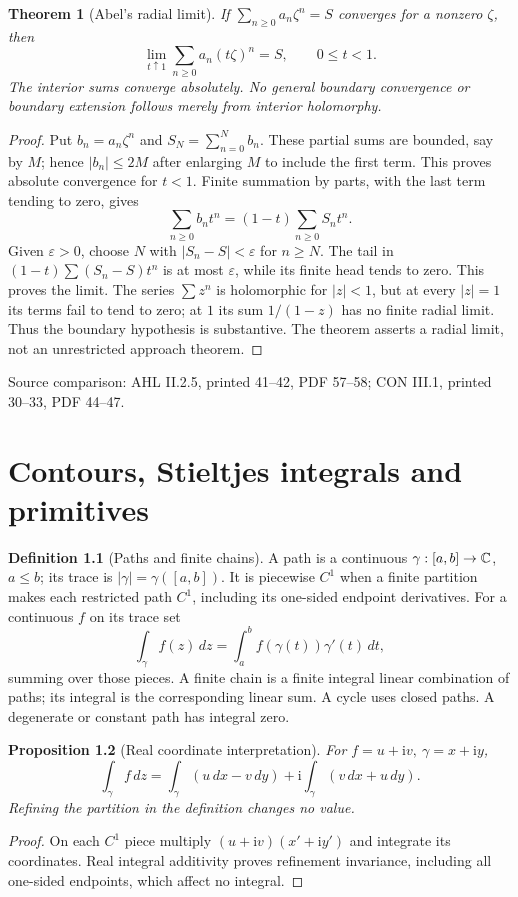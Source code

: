 \documentclass[11pt,a4paper,openany]{book}
\newtheorem{theorem}{Theorem}[chapter]
\newtheorem{proposition}[theorem]{Proposition}
\theoremstyle{definition}
\newtheorem{definition}[theorem]{Definition}
\theoremstyle{remark}\newtheorem{remark}[theorem]{Remark}
\newcommand{\eps}{\varepsilon}\newcommand{\ee}{\varepsilon}
\newcommand{\dd}{\,d}\newcommand{\iu}{\mathrm i}
\newcommand{\family}[1]{}
\newcommand{\source}[1]{\par\begingroup\small\sffamily\color{black!65}Source comparison: #1\par\endgroup}
\begin{document}
\begin{theorem}[Abel's radial limit]\family{D12.02.06}\label{d12:02-06}
If \(\sum_{n\ge0}a_n\zeta^n=S\) converges for a nonzero \(\zeta\), then
\[
 \lim_{t\uparrow1}\sum_{n\ge0}a_n(t\zeta)^n=S,\qquad 0\le t<1.
\]
The interior sums converge absolutely. No general boundary convergence
or boundary extension follows merely from interior holomorphy.
\end{theorem}
\begin{proof}
Put \(b_n=a_n\zeta^n\) and \(S_N=\sum_{n=0}^Nb_n\).
These partial sums are bounded, say by \(M\); hence \(|b_n|\le2M\)
after enlarging \(M\) to include the first term. This proves absolute
convergence for \(t<1\). Finite summation by parts, with the last term
tending to zero, gives
\[
 \sum_{n\ge0}b_nt^n=(1-t)\sum_{n\ge0}S_nt^n.
\]
Given \(\eps>0\), choose \(N\) with \(|S_n-S|<\eps\) for \(n\ge N\).
The tail in \((1-t)\sum(S_n-S)t^n\) is at most \(\eps\), while its
finite head tends to zero. This proves the limit.
The series \(\sum z^n\) is holomorphic for \(|z|<1\), but at every
\(|z|=1\) its terms fail to tend to zero; at \(1\) its sum
\(1/(1-z)\) has no finite radial limit. Thus the boundary hypothesis is
substantive. The theorem asserts a radial limit, not an unrestricted
approach theorem.
\end{proof}
\source{AHL II.2.5, printed 41--42, PDF 57--58; CON III.1, printed 30--33, PDF 44--47.}



\chapter{Contours, Stieltjes integrals and primitives}\label{ch:d12-03}

\begin{definition}[Paths and finite chains]\family{D12.03.01}\label{d12:03-01}
A path is a continuous \(\gamma:[a,b]\to\mathbb C\), \(a\le b\); its trace is
\(|\gamma|=\gamma([a,b])\). It is piecewise \(C^1\) when a finite
partition makes each restricted path \(C^1\), including its one-sided
endpoint derivatives. For a continuous \(f\) on its trace set
\[
 \int_\gamma f(z)\dd z=\int_a^b f(\gamma(t))\gamma'(t)\dd t,
\]
summing over those pieces. A finite chain is a finite integral linear
combination of paths; its integral is the corresponding linear sum.
A cycle uses closed paths. A degenerate or constant path has integral zero.
\end{definition}
\begin{proposition}[Real coordinate interpretation]\label{d12:03-01-coordinates}
For \(f=u+\iu v,\ \gamma=x+\iu y\),
\[
 \int_\gamma f\dd z
 =\int_\gamma(u\dd x-v\dd y)+\iu\int_\gamma(v\dd x+u\dd y).
\]
Refining the partition in the definition changes no value.
\end{proposition}
\begin{proof}
On each \(C^1\) piece multiply
\((u+\iu v)(x'+\iu y')\) and integrate its coordinates.
Real integral additivity proves refinement invariance, including all
one-sided endpoints, which affect no integral.
\end{proof}
\end{document}
